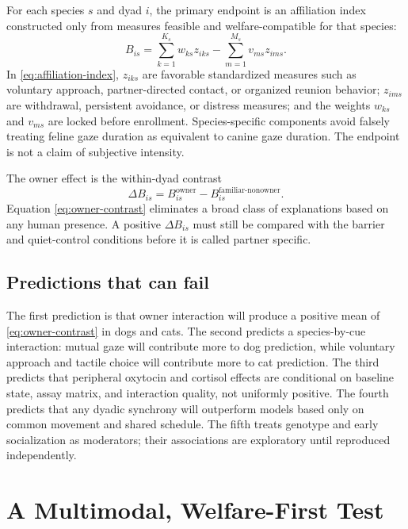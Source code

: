 \documentclass[conference]{IEEEtran}
\begin{document}
For each species $s$ and dyad $i$, the primary endpoint is an affiliation index constructed only from measures feasible and welfare-compatible for that species:
\begin{equation}
B_{is}=\sum_{k=1}^{K_s}w_{ks}z_{iks}-\sum_{m=1}^{M_s}v_{ms}z_{ims}.
\label{eq:affiliation-index}
\end{equation}
In \eqref{eq:affiliation-index}, $z_{iks}$ are favorable standardized measures such as voluntary approach, partner-directed contact, or organized reunion behavior; $z_{ims}$ are withdrawal, persistent avoidance, or distress measures; and the weights $w_{ks}$ and $v_{ms}$ are locked before enrollment. Species-specific components avoid falsely treating feline gaze duration as equivalent to canine gaze duration. The endpoint is not a claim of subjective intensity.

The owner effect is the within-dyad contrast
\begin{equation}
\Delta B_{is}=B_{is}^{\mathrm{owner}}-B_{is}^{\mathrm{familiar\mbox{-}nonowner}}.
\label{eq:owner-contrast}
\end{equation}
Equation \eqref{eq:owner-contrast} eliminates a broad class of explanations based on any human presence. A positive $\Delta B_{is}$ must still be compared with the barrier and quiet-control conditions before it is called partner specific.

\subsection{Predictions that can fail}

The first prediction is that owner interaction will produce a positive mean of \eqref{eq:owner-contrast} in dogs and cats. The second predicts a species-by-cue interaction: mutual gaze will contribute more to dog prediction, while voluntary approach and tactile choice will contribute more to cat prediction. The third predicts that peripheral oxytocin and cortisol effects are conditional on baseline state, assay matrix, and interaction quality, not uniformly positive. The fourth predicts that any dyadic synchrony will outperform models based only on common movement and shared schedule. The fifth treats genotype and early socialization as moderators; their associations are exploratory until reproduced independently.

\section{A Multimodal, Welfare-First Test}
\end{document}
